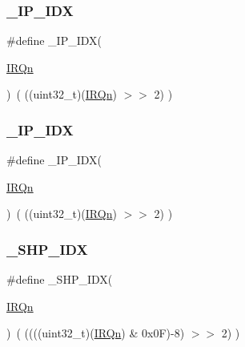 \subsubsection{\texorpdfstring{\_IP\_IDX}{\_IP\_IDX}\hspace{0.1cm}{\footnotesize\ttfamily [2/3]}}
{\footnotesize\ttfamily \#define \+\_\+\+I\+P\+\_\+\+I\+DX(\begin{DoxyParamCaption}\item[{}]{\mbox{\hyperlink{group___configuration__section__for___c_m_s_i_s_ga666eb0caeb12ec0e281415592ae89083}{I\+R\+Qn}} }\end{DoxyParamCaption})~(   ((uint32\+\_\+t)(\mbox{\hyperlink{group___configuration__section__for___c_m_s_i_s_ga666eb0caeb12ec0e281415592ae89083}{I\+R\+Qn}})            $>$$>$    2)     )}

\mbox{\label{group___c_m_s_i_s___core___n_v_i_c_functions_ga370ec4b1751a6a889d849747df3763a9}} 
\subsubsection{\texorpdfstring{\_IP\_IDX}{\_IP\_IDX}\hspace{0.1cm}{\footnotesize\ttfamily [3/3]}}
{\footnotesize\ttfamily \#define \+\_\+\+I\+P\+\_\+\+I\+DX(\begin{DoxyParamCaption}\item[{}]{\mbox{\hyperlink{group___configuration__section__for___c_m_s_i_s_ga666eb0caeb12ec0e281415592ae89083}{I\+R\+Qn}} }\end{DoxyParamCaption})~(   ((uint32\+\_\+t)(\mbox{\hyperlink{group___configuration__section__for___c_m_s_i_s_ga666eb0caeb12ec0e281415592ae89083}{I\+R\+Qn}})            $>$$>$    2)     )}

\mbox{\label{group___c_m_s_i_s___core___n_v_i_c_functions_gaee4f7eb5d7e770ad51489dbceabb1755}} 
\subsubsection{\texorpdfstring{\_SHP\_IDX}{\_SHP\_IDX}\hspace{0.1cm}{\footnotesize\ttfamily [1/3]}}
{\footnotesize\ttfamily \#define \+\_\+\+S\+H\+P\+\_\+\+I\+DX(\begin{DoxyParamCaption}\item[{}]{\mbox{\hyperlink{group___configuration__section__for___c_m_s_i_s_ga666eb0caeb12ec0e281415592ae89083}{I\+R\+Qn}} }\end{DoxyParamCaption})~( ((((uint32\+\_\+t)(\mbox{\hyperlink{group___configuration__section__for___c_m_s_i_s_ga666eb0caeb12ec0e281415592ae89083}{I\+R\+Qn}}) \& 0x0\+F)-\/8) $>$$>$    2)     )}

